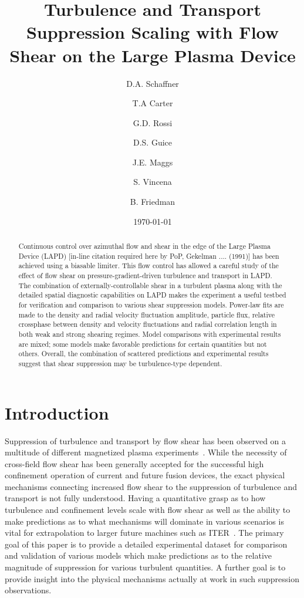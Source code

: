 \documentclass[aip,pop,amsmath,amssymb,reprint,superscriptaddress]{revtex4-1} %
\begin{document}
\title{Turbulence and Transport Suppression Scaling with Flow Shear on the Large Plasma Device}
\author{D.A. Schaffner}
\author{T.A Carter}
\author{G.D. Rossi}
\author{D.S. Guice}
\author{J.E. Maggs}
\author{S. Vincena}
\author{B. Friedman}
\date{\today}
\begin{abstract}
Continuous control over azimuthal flow and shear in the edge of the Large Plasma Device (LAPD) [in-line citation required here by PoP, Gekelman .... (1991)] has been achieved using a biasable limiter.  This flow control has allowed a careful study of the effect of flow shear on pressure-gradient-driven turbulence and transport in LAPD. The combination of externally-controllable shear in a turbulent plasma along with the detailed spatial diagnostic capabilities on LAPD makes the experiment a useful testbed for verification and comparison to various shear suppression models. Power-law fits are made to the density and radial velocity fluctuation amplitude, particle flux, relative crossphase between density and velocity fluctuations and radial correlation length in both weak and strong shearing regimes. Model comparisons with experimental results are mixed; some models make favorable predictions for certain quantities but not others. Overall, the combination of scattered predictions and experimental results suggest that shear suppression may be turbulence-type dependent.
\end{abstract}
\maketitle

\section{Introduction}

Suppression of turbulence and transport by flow shear has been observed on a multitude of different magnetized plasma experiments~\cite{burrell99,oost03,sakai93}. While the necessity of cross-field flow shear has been generally accepted for the successful high confinement operation of current and future fusion devices, the exact physical mechanisms connecting increased flow shear to the suppression of turbulence and transport is not fully understood. Having a quantitative grasp as to how turbulence and confinement levels scale with flow shear as well as the ability to make predictions as to what mechanisms will dominate in various scenarios is vital for extrapolation to larger future machines such as ITER~\cite{burrell97,terry00}. The primary goal of this paper is to provide a detailed experimental dataset for comparison and validation of various models which make predictions as to the relative magnitude of suppression for various turbulent quantities. A further goal is to provide insight into the physical mechanisms actually at work in such suppression observations.
\end{document}
